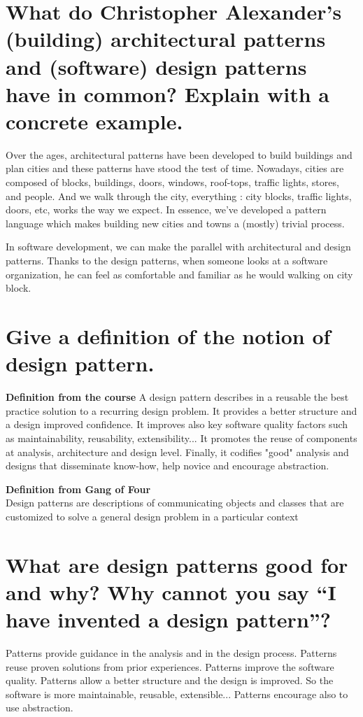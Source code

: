 \section{What do Christopher Alexander’s (building) architectural patterns and (software) design patterns have in common? Explain with a concrete example.}

Over the ages, architectural patterns have been developed to build buildings and plan cities and these patterns have stood the test of time.
Nowadays, cities are composed of  blocks, buildings, doors, windows, roof-tops, traffic lights, stores, and people. And we walk through the city, everything : city blocks, traffic lights, doors, etc, works the way we expect. In essence, we’ve developed a pattern language which makes building new cities and towns a (mostly) trivial process. 

In software development, we can make the parallel with architectural and design patterns. Thanks to the design patterns, when someone looks at a software organization, he can feel as comfortable and familiar as he would walking on city block.

\section{Give a definition of the notion of design pattern.}

\textbf{Definition from the course}
A design pattern describes in a reusable the best practice solution to a recurring design problem. It provides a better structure and a design improved confidence. It improves also key software quality factors such as maintainability, reusability, extensibility... It promotes the reuse of components at analysis, architecture and design level. Finally, it codifies "good" analysis and designs that disseminate know-how, help novice and encourage abstraction.

\textbf{Definition from Gang of Four} \\
Design patterns are descriptions of communicating objects and classes that are customized to solve a general design problem in a particular context

\section{What are design patterns good for and why?
Why cannot you say “I have invented a design pattern”?}

Patterns provide guidance in the analysis and in the design process. Patterns reuse proven solutions from prior experiences. Patterns improve the software quality. Patterns allow a better structure and the design is improved. So the software is more maintainable, reusable, extensible... Patterns encourage also to use abstraction.

